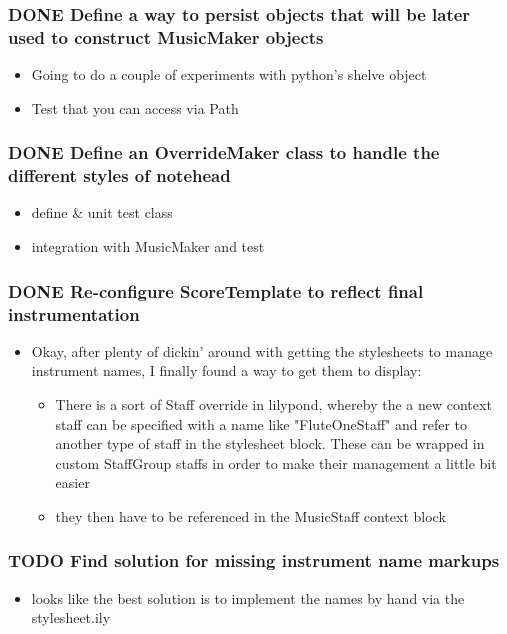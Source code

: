 \documentclass[11pt]{article}
\begin{document}
\subsubsection*{{\bfseries\sffamily DONE} Define a way to persist objects that will be later used to construct MusicMaker objects}
\label{sec:org065bdea}
\begin{itemize}
\item Going to do a couple of experiments with python's shelve object

\item Test that you can access via Path
\end{itemize}

\subsubsection*{{\bfseries\sffamily DONE} Define an OverrideMaker class to handle the different styles of notehead}
\label{sec:org33a1dba}
\begin{itemize}
\item define \& unit test class
\item integration with MusicMaker and test
\end{itemize}
\subsubsection*{{\bfseries\sffamily DONE} Re-configure ScoreTemplate to reflect final instrumentation}
\label{sec:org5ac0ca6}
\begin{itemize}
\item Okay, after plenty of dickin' around with getting the stylesheets to manage instrument names, I finally found a way to get them to display:
\begin{itemize}
\item There is a sort of Staff override in lilypond, whereby the a new context staff can be specified with a name like "FluteOneStaff" and refer to another type of staff in the stylesheet block. These can be wrapped in custom StaffGroup staffs in order to make their management a little bit easier

\item they then have to be referenced in the MusicStaff context block
\end{itemize}
\end{itemize}
\subsubsection*{{\bfseries\sffamily TODO} Find solution for missing instrument name markups}
\label{sec:org025e23d}
\begin{itemize}
\item looks like the best solution is to implement the names by hand via the stylesheet.ily
\end{itemize}
\end{document}

